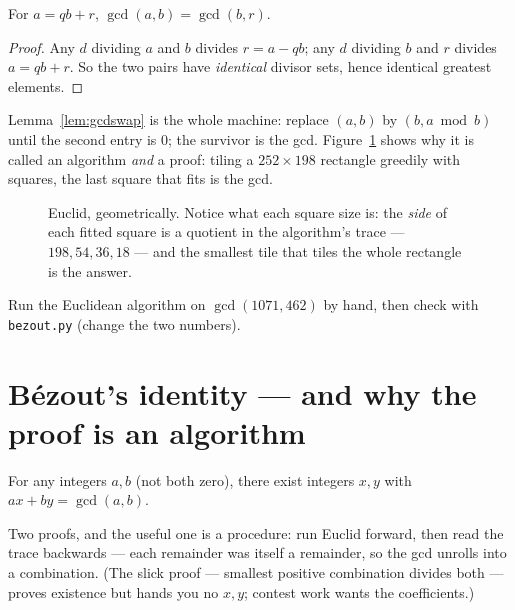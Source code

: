 \begin{lemma}\label{lem:gcdswap}
For $a = qb + r$, $\gcd(a, b) = \gcd(b, r)$.
\end{lemma}

\begin{proof}
Any $d$ dividing $a$ and $b$ divides $r = a - qb$; any $d$ dividing $b$ and
$r$ divides $a = qb + r$. So the two pairs have \emph{identical} divisor
sets, hence identical greatest elements.
\end{proof}

Lemma~\ref{lem:gcdswap} is the whole machine: replace $(a,b)$ by $(b, a
\bmod b)$ until the second entry is $0$; the survivor is the gcd.
Figure~\ref{fig:euclid-rect} shows why it is called an algorithm \emph{and}
a proof: tiling a $252 \times 198$ rectangle greedily with squares, the last
square that fits is the gcd.

\begin{figure}[ht]\centering

\caption{Euclid, geometrically. Notice what each square size is: the
\emph{side} of each fitted square is a quotient in the algorithm's trace ---
$198, 54, 36, 18$ --- and the smallest tile that tiles the whole rectangle
is the answer.}
\label{fig:euclid-rect}
\end{figure}

\begin{exercise}[easy]\label{exr:gcdcalc}
Run the Euclidean algorithm on $\gcd(1071, 462)$ by hand, then check with
\texttt{bezout.py} (change the two numbers).
\end{exercise}

\section{B\'ezout's identity --- and why the proof is an algorithm}\label{sec:bezout}

\begin{theorem}[B\'ezout]
For any integers $a, b$ (not both zero), there exist integers $x, y$ with
$ax + by = \gcd(a,b)$.
\end{theorem}

Two proofs, and the useful one is a procedure: run Euclid forward, then read
the trace backwards --- each remainder was itself a remainder, so the gcd
unrolls into a combination. (The slick proof --- smallest positive
combination divides both --- proves existence but hands you no $x, y$;
contest work wants the coefficients.)

